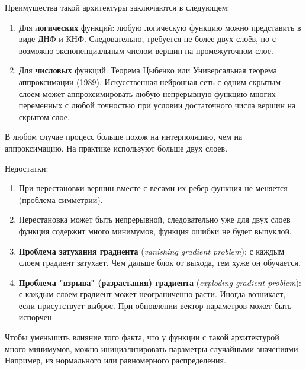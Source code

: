 Преимущества такой архитектуры заключаются в следующем:
\begin{enumerate}
    \item Для \textbf{логических} функций: любую логическую функцию можно представить в виде ДНФ и КНФ. Следовательно, требуется не более двух слоёв, но с возможно экспоненциальным числом вершин на промежуточном слое.
    \item Для \textbf{числовых} функций: Теорема Цыбенко или Универсальная теорема аппроксимации (1989). Искусственная нейронная сеть с одним скрытым слоем может аппроксимировать любую непрерывную функцию многих переменных с любой точностью при условии достаточного числа вершин на скрытом слое.
\end{enumerate}

\begin{remark}
    В любом случае процесс больше похож на интерполяцию, чем на аппроксимацию. На практике используют больше двух слоев.
\end{remark}

Недостатки:
\begin{enumerate}
    \item При перестановки вершин вместе с весами их ребер функция не меняется (проблема симметрии).
    \item Перестановка может быть непрерывной, следовательно уже для двух слоев функция содержит много минимумов, функция ошибки не будет выпуклой.
    \item \textbf{Проблема затухания градиента} (\textit{vanishing gradient problem}): с каждым слоем градиент затухает. Чем дальше блок от выхода, тем хуже он обучается.
    \item \textbf{Проблема "взрыва" (разрастания) градиента} (\textit{exploding gradient problem}): с каждым слоем градиент может неограниченно расти. Иногда возникает, если присутствует выброс. При обновлении вектор параметров может быть испорчен.
\end{enumerate}

\begin{remark}
    Чтобы уменьшить влияние того факта, что у функции с такой архитектурой много минимумов, можно инициализировать параметры случайными значениями. Например, из нормального или равномерного распределения.
\end{remark}

